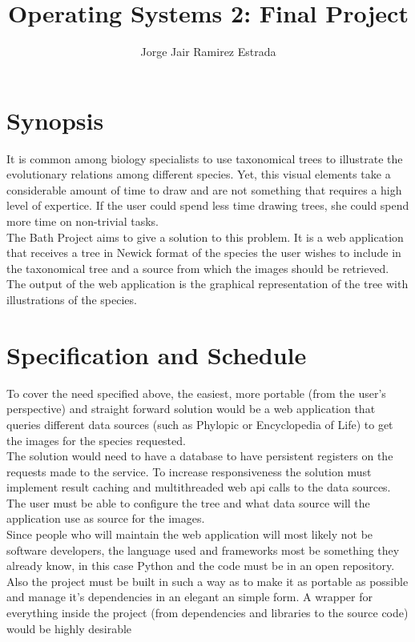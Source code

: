 \documentclass[10pt]{article}
\author{Jorge Jair Ramirez Estrada}
\title{Operating Systems 2: Final Project}
\begin{document}
\maketitle

\section{Synopsis}
It is common among biology specialists to use taxonomical trees to illustrate the evolutionary relations among different species. Yet, this visual elements take a considerable amount of time to draw and are not something that requires a high level of expertice. If the user could spend less time drawing trees, she could spend more time on non-trivial tasks.\\

The Bath Project aims to give a solution to this problem. It is a web application that receives a tree in Newick format of the species the user wishes to include in the taxonomical tree and a source from which the images should be retrieved. The output of the web application is the graphical representation of the tree with illustrations of the species.

\section{Specification and Schedule}
To cover the need specified above, the easiest, more portable (from the user's perspective) and straight forward solution would be a web application that queries different data sources (such as Phylopic or Encyclopedia of Life) to get the images for the species requested.\\

The solution would need to have a database to have persistent registers on the requests made to the service. To increase responsiveness the solution must implement result caching and multithreaded web api calls to the data sources. The user must be able to configure the tree and what data source will the application use as source for the images.\\

Since people who will maintain the web application will most likely not be software developers, the language used and frameworks most be something they already know, in this case Python and the code must be in an open repository. Also the project must be built in such a way as to make it as portable as possible and manage it's dependencies in an elegant an simple form. A wrapper for everything inside the project (from dependencies and libraries to the source code) would be highly desirable
\end{document}
